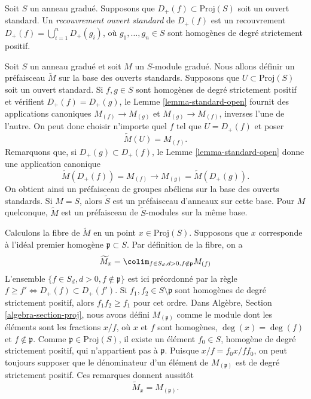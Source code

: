 \begin{definition}
\label{definition-standard-covering}
Soit $S$ un anneau gradué. Supposons que
$D_{+}(f) \subset \text{Proj}(S)$ soit un ouvert standard. Un
{\it recouvrement ouvert standard} de $D_{+}(f)$ est un recouvrement
$D_{+}(f) = \bigcup_{i = 1}^n D_{+}(g_i)$, où
$g_1, \ldots, g_n \in S$ sont homogènes de degré strictement positif.
\end{definition}

\noindent
Soit $S$ un anneau gradué et soit $M$ un $S$-module gradué. Nous allons
définir un préfaisceau $\widetilde M$ sur la base des ouverts standards.
Supposons que $U \subset \text{Proj}(S)$ soit un ouvert standard.
Si $f, g \in S$ sont homogènes de degré strictement positif et vérifient
$D_{+}(f) = D_{+}(g)$, le Lemme \ref{lemma-standard-open} fournit des
applications canoniques $M_{(f)} \to M_{(g)}$ et
$M_{(g)} \to M_{(f)}$, inverses l'une de l'autre. On peut donc choisir
n'importe quel $f$ tel que $U = D_{+}(f)$ et poser
$$
\widetilde M(U) = M_{(f)}.
$$
Remarquons que, si $D_{+}(g) \subset D_{+}(f)$, le
Lemme \ref{lemma-standard-open} donne une application canonique
$$
\widetilde M(D_{+}(f)) = M_{(f)} \longrightarrow
M_{(g)} = \widetilde M(D_{+}(g)).
$$
On obtient ainsi un préfaisceau de groupes abéliens sur la base des ouverts
standards. Si $M = S$, alors $\widetilde S$ est un préfaisceau d'anneaux sur
cette base. Pour $M$ quelconque, $\widetilde M$ est un préfaisceau de
$\widetilde S$-modules sur la même base.

\medskip\noindent
Calculons la fibre de $\widetilde M$ en un point
$x \in \text{Proj}(S)$. Supposons que $x$ corresponde à l'idéal premier
homogène $\mathfrak p \subset S$. Par définition de la fibre, on a
$$
\widetilde M_x
=
\colim_{f\in S_d, d > 0, f\not\in \mathfrak p} M_{(f)}
$$
L'ensemble $\{f \in S_d, d > 0, f \not \in \mathfrak p\}$ est ici préordonné
par la règle
$f \geq f' \Leftrightarrow D_{+}(f) \subset D_{+}(f')$.
Si $f_1, f_2 \in S \setminus \mathfrak p$ sont homogènes de degré strictement
positif, alors $f_1f_2 \geq f_1$ pour cet ordre. Dans Algèbre,
Section \ref{algebra-section-proj}, nous avons défini
$M_{(\mathfrak p)}$ comme le module dont les éléments sont les fractions
$x/f$, où $x$ et $f$ sont homogènes,
$\deg(x) = \deg(f)$ et $f \not \in \mathfrak p$.
Comme $\mathfrak p \in \text{Proj}(S)$, il existe un élément
$f_0 \in S$, homogène de degré strictement positif, qui n'appartient pas à
$\mathfrak p$. Puisque $x/f = f_0x/ff_0$, on peut toujours supposer que le
dénominateur d'un élément de $M_{(\mathfrak p)}$ est de degré strictement
positif. Ces remarques donnent aussitôt
$$
\widetilde M_x = M_{(\mathfrak p)}.
$$


